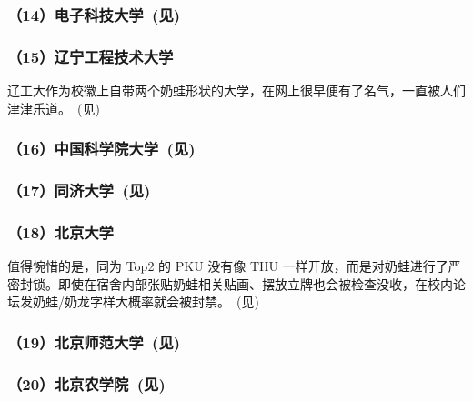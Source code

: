 

\subsubsection[（14）电子科技大学]{（14）电子科技大学~(见)}



\clearpage
\subsubsection{（15）辽宁工程技术大学}



辽工大作为校徽上自带两个奶蛙形状的大学，在网上很早便有了名气，一直被人们津津乐道。~(见)

\subsubsection[（16）中国科学院大学]{（16）中国科学院大学~(见)}



\subsubsection[（17）同济大学]{（17）同济大学~(见)}



\clearpage
\subsubsection{（18）北京大学}



值得惋惜的是，同为 Top2 的 PKU 没有像 THU 一样开放，而是对奶蛙进行了严密封锁。即使在宿舍内部张贴奶蛙相关贴画、摆放立牌也会被检查没收，在校内论坛发奶蛙/奶龙字样大概率就会被封禁。~(见)

\subsubsection[（19）北京师范大学]{（19）北京师范大学~(见)}



\subsubsection[（20）北京农学院]{（20）北京农学院~(见)}

